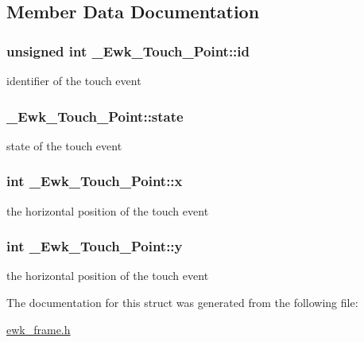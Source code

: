 \subsection{Member Data Documentation}
\hypertarget{struct__Ewk__Touch__Point_af88ddf2a25cbe6b911e945df64d25821}{
\subsubsection[{id}]{\setlength{\rightskip}{0pt plus 5cm}unsigned int \+\_\+\+Ewk\+\_\+\+Touch\+\_\+\+Point\+::id}}\label{struct__Ewk__Touch__Point_af88ddf2a25cbe6b911e945df64d25821}
identifier of the touch event \hypertarget{struct__Ewk__Touch__Point_ac729779f54e01949977ef51e24749740}{
\subsubsection[{state}]{ \+\_\+\+Ewk\+\_\+\+Touch\+\_\+\+Point\+::state}}\label{struct__Ewk__Touch__Point_ac729779f54e01949977ef51e24749740}
state of the touch event \hypertarget{struct__Ewk__Touch__Point_abb6aea835ff98e71af22e1dd3523a123}{
\subsubsection[{x}]{\setlength{\rightskip}{0pt plus 5cm}int \+\_\+\+Ewk\+\_\+\+Touch\+\_\+\+Point\+::x}}\label{struct__Ewk__Touch__Point_abb6aea835ff98e71af22e1dd3523a123}
the horizontal position of the touch event \hypertarget{struct__Ewk__Touch__Point_ad686c71c608ed1ca11dcd4853964a531}{
\subsubsection[{y}]{\setlength{\rightskip}{0pt plus 5cm}int \+\_\+\+Ewk\+\_\+\+Touch\+\_\+\+Point\+::y}}\label{struct__Ewk__Touch__Point_ad686c71c608ed1ca11dcd4853964a531}
the horizontal position of the touch event 

The documentation for this struct was generated from the following file\+:\begin{DoxyCompactItemize}
\item 
\hyperlink{ewk__frame_8h}{ewk\+\_\+frame.\+h}\end{DoxyCompactItemize}

